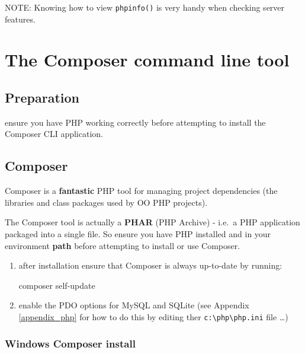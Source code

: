 \documentclass[a4paperpaper,openright]{book}
\newenvironment{Shaded}{}{}
\newcommand{\ExtensionTok}[1]{#1}
\newcommand{\NormalTok}[1]{#1}
\begin{document}
NOTE: Knowing how to view \texttt{phpinfo()} is very handy when checking
server features.

\hypertarget{the-composer-command-line-tool}{%
\chapter{\texorpdfstring{The Composer command line
tool\label{cli_tools}}{The Composer command line tool}}\label{the-composer-command-line-tool}}

\hypertarget{preparation-1}{%
\section{Preparation}\label{preparation-1}}

ensure you have PHP working correctly before attempting to install the
Composer CLI application.

\hypertarget{composer}{%
\section{Composer}\label{composer}}

Composer is a \textbf{fantastic} PHP tool for managing project
dependencies (the libraries and class packages used by OO PHP projects).

The Composer tool is actually a \textbf{PHAR} (PHP Archive) - i.e.~a PHP
application packaged into a single file. So ensure you have PHP
installed and in your environment \textbf{path} before attempting to
install or use Composer.

\begin{enumerate}
\def\labelenumi{\arabic{enumi}.}
\item
  after installation ensure that Composer is always up-to-date by
  running:

\begin{Shaded}
\begin{Highlighting}[]
    \ExtensionTok{composer}\NormalTok{ self-update}
\end{Highlighting}
\end{Shaded}
\item
  enable the PDO options for MySQL and SQLite (see Appendix
  \ref{appendix_php} for how to do this by editing ther
  \texttt{c:\textbackslash{}php\textbackslash{}php.ini} file \ldots{})
\end{enumerate}

\hypertarget{windows-composer-install}{%
\subsection{Windows Composer install}\label{windows-composer-install}}
\end{document}
